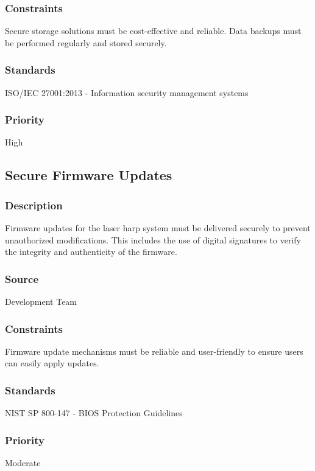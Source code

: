 \subsubsection{Constraints}
Secure storage solutions must be cost-effective and reliable. Data backups must be performed regularly and stored securely.
\subsubsection{Standards}
ISO/IEC 27001:2013 - Information security management systems
\subsubsection{Priority}
High


\subsection{Secure Firmware Updates}
\subsubsection{Description}
Firmware updates for the laser harp system must be delivered securely to prevent unauthorized modifications. This includes the use of digital signatures to verify the integrity and authenticity of the firmware.
\subsubsection{Source}
Development Team
\subsubsection{Constraints}
Firmware update mechanisms must be reliable and user-friendly to ensure users can easily apply updates.
\subsubsection{Standards}
NIST SP 800-147 - BIOS Protection Guidelines
\subsubsection{Priority}
Moderate
